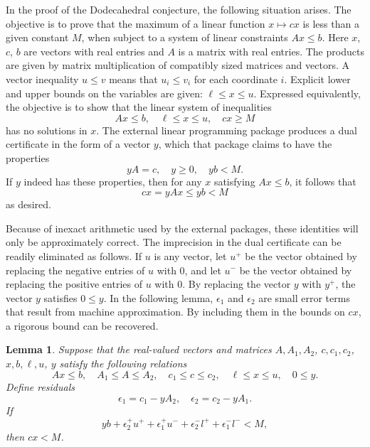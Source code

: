 \documentclass{article} %
\newtheorem{lemma}{Lemma}[subsection]
\begin{document}
In the proof of the Dodecahedral conjecture, the following situation
arises. The objective is to prove that the maximum of a linear
function $x\mapsto c x$ is less than a given constant $M$, when
subject to a system of linear constraints $A x \le b$. Here $x$, $c$,
$b$ are vectors with real entries and $A$ is a matrix with real
entries. The products are given by matrix multiplication of compatibly
sized matrices and vectors. A vector inequality $u\le v$ means that
$u_i \le v_i$ for each coordinate $i$. Explicit lower and upper bounds
on the variables are given: $\ell \le x \le u$. Expressed
equivalently, the objective is to show that the linear system of
inequalities
$$
A x \le b,\quad \ell \le x\le u,\quad c x \ge M
$$
has no solutions in $x$. The external linear programming package
produces a dual certificate in the form of a vector $y$, which that
package claims to have the properties
\begin{equation}
  y A = c,\quad y\ge 0,\quad y b < M.
\end{equation}
If $y$ indeed has these properties, then for any $x$ satisfying
$A x \le b$, it follows that
\begin{equation}\label{eqn:cxM}
  c x = y A x \le y b < M
\end{equation}
as desired.

Because of inexact arithmetic used by the external packages, these
identities will only be approximately correct. The imprecision in the
dual certificate can be readily eliminated as follows. If $u$ is any
vector, let $u^+$ be the vector obtained by replacing the negative
entries of $u$ with $0$, and let $u^-$ be the vector obtained by
replacing the positive entries of $u$ with $0$. By replacing the
vector $y$ with $y^+$, the vector $y$ satisfies $0\le y$. In the
following lemma, $\epsilon_1$ and $\epsilon_2$ are small error terms
that result from machine approximation. By including them in the
bounds on $c x$, a rigorous bound can be recovered.


\begin{lemma}  Suppose that the real-valued vectors and matrices
$A,A_1,A_2$, $c,c_1,c_2$, $x,b,\ell,u$, $y$ satisfy the following
relations
  $$
  A x\le b, \quad A_1 \le A \le A_2,
  \quad c_1 \le c \le c_2,\quad \ell\le x\le u,\quad
  0\le y.
  $$
Define residuals
  $$
   \epsilon_1 = c_1 - y A_2,\quad \epsilon_2 = c_2  - y A_1.
  $$
If
$$
y b + \epsilon_2^+ u^+ + \epsilon_1^+ u^- + \epsilon_2^- l^+ + \epsilon_1^- l^- < M,
$$
then $c x < M$.
\end{lemma}
\end{document}
